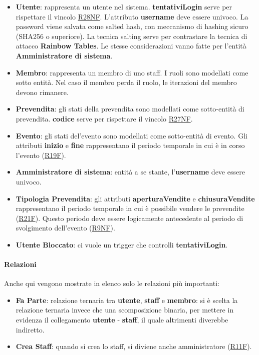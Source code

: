 \documentclass[a4paper]{article}
\begin{document}
\begin{itemize}
    \item \textbf{Utente}: rappresenta un utente nel sistema. \textbf{tentativiLogin} serve per rispettare il vincolo \hyperlink{R28NF}{R28NF}. L'attributo \textbf{username} deve essere univoco. La password viene salvata come salted hash, con meccanismo di hashing sicuro (SHA256 o superiore). La tecnica salting serve per contrastare la tecnica di attacco \textbf{Rainbow Tables}. Le stesse considerazioni vanno fatte per l'entità \textbf{Amministratore di sistema}.
    \item \textbf{Membro}: rappresenta un membro di uno staff. I ruoli sono modellati come sotto entità. Nel caso il membro perda il ruolo, le iterazioni del membro devono rimanere.
    \item \textbf{Prevendita}: gli stati della prevendita sono modellati come sotto-entità di prevendita. \textbf{codice} serve per rispettare il vincolo \hyperlink{R27NF}{R27NF}.
    \item \textbf{Evento}: gli stati del'evento sono modellati come sotto-entità di evento. Gli attributi \textbf{inizio} e \textbf{fine} rappresentano il periodo temporale in cui è in corso l'evento (\hyperlink{R19F}{R19F}).
    \item \textbf{Amministratore di sistema}: entità a se stante, l'\textbf{username} deve essere univoco.
    \item \textbf{Tipologia Prevendita}: gli attributi \textbf{aperturaVendite} e \textbf{chiusuraVendite} rappresentano il periodo temporale in cui è possibile vendere le prevendite (\hyperlink{R21F}{R21F}). Questo periodo deve essere logicamente antecedente al periodo di svolgimento dell'evento (\hyperlink{R9NF}{R9NF}).
    \item \textbf{Utente Bloccato}: ci vuole un trigger che controlli \textbf{tentativiLogin}.
\end{itemize}


\paragraph{Relazioni} Anche qui vengono mostrate in elenco solo le relazioni più importanti:
\begin{itemize}
    \item \textbf{Fa Parte}: relazione ternaria tra \textbf{utente}, \textbf{staff} e \textbf{membro}: si è scelta la relazione ternaria invece che una scomposizione binaria, per mettere in evidenza il collegamento \textbf{utente} - \textbf{staff}, il quale altrimenti diverebbe indiretto.
    \item \textbf{Crea Staff}: quando si crea lo staff, si diviene anche amministratore (\hyperlink{R11F}{R11F}).
\end{itemize}
\end{document}
